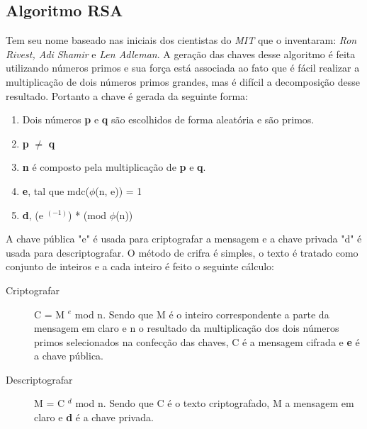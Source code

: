 \subsection{Algoritmo RSA}
\label{algorithm-rsa}

Tem seu nome baseado nas iniciais dos cientistas do \textit{MIT} que o inventaram: \textit{Ron Rivest, Adi Shamir} e \textit{Len Adleman}. A geração das chaves desse algoritmo é feita utilizando números primos e sua força está associada ao fato que é fácil realizar a multiplicação de dois números primos grandes, mas é difícil a decomposição desse resultado. Portanto a chave é gerada da seguinte forma:

\begin{enumerate}
\item Dois números \textbf{p} e \textbf{q} são escolhidos de forma aleatória e são primos.
\item \textbf{p} $\neq$ \textbf{q}
\item \textbf{n} é composto pela multiplicação de \textbf{p} e \textbf{q}.
\item \textbf{e}, tal que mdc($\phi$(n, e)) = 1
\item \textbf{d}, (e $^ {(-1)}$) * (mod $\phi$(n)) 
\end{enumerate}

%
A chave pública "e" é usada para criptografar a mensagem e a chave privada "d" é usada para descriptografar. O método de crifra é simples, o texto é tratado como conjunto de inteiros e a cada inteiro é feito o seguinte cálculo:

\begin{description}
\item [Criptografar]
C = M $^ e$ mod n. Sendo que M é o inteiro correspondente a parte da mensagem em claro e n o resultado da multiplicação dos dois números primos selecionados na confecção  das chaves, C é a mensagem cifrada e \textbf{e} é a chave pública. 
\item [Descriptografar]
M = C $^ d$ mod n. Sendo que C é o texto criptografado, M a mensagem em claro e \textbf{d} é a chave privada.
\end{description}

%